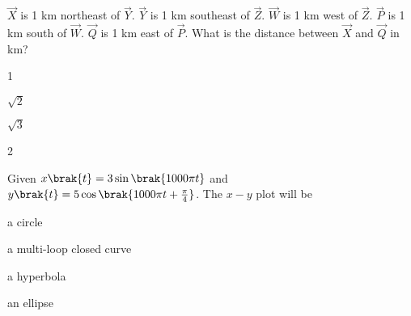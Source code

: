     \item $\vec{X}$ is 1 km northeast of $\vec{Y}$. $\vec{Y}$ is 1 km southeast of $\vec{Z}$. $\vec{W}$ is 1 km west of $\vec{Z}$. $\vec{P}$ is 1 km south of $\vec{W}$. $\vec{Q}$ is 1 km east of $\vec{P}$. What is the distance between $\vec{X}$ and $\vec{Q}$ in km?

    \hfill{}
        \begin{enumerate}
    \begin{multicols}{4}
            \item 1
            \item $\sqrt{2}$
            \item $\sqrt{3}$
            \item 2
    \end{multicols}
        \end{enumerate}
    \item Given $x\brak{t} = 3 \sin\brak{1000 \pi t}$ and $y\brak{t} = 5 \cos\brak{1000 \pi t + \frac{\pi}{4}}$. The $x-y$ plot will be

    \hfill{}
        \begin{enumerate}
    \begin{multicols}{2}
            \item a circle
            \item a multi-loop closed curve
            \item a hyperbola
            \item an ellipse
            
    \end{multicols}
        \end{enumerate}
    
